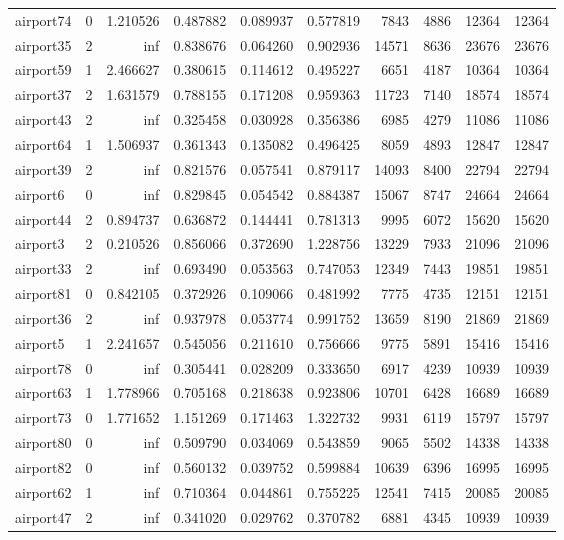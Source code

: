 \begin{longtable}{|l|r|r|r|r|r|r|r|r|r|}
airport74 & 0 & 1.210526 & 0.487882 & 0.089937 & 0.577819 & 7843 & 4886 & 12364 & 12364 \\
airport35 & 2 & inf & 0.838676 & 0.064260 & 0.902936 & 14571 & 8636 & 23676 & 23676 \\
airport59 & 1 & 2.466627 & 0.380615 & 0.114612 & 0.495227 & 6651 & 4187 & 10364 & 10364 \\
airport37 & 2 & 1.631579 & 0.788155 & 0.171208 & 0.959363 & 11723 & 7140 & 18574 & 18574 \\
airport43 & 2 & inf & 0.325458 & 0.030928 & 0.356386 & 6985 & 4279 & 11086 & 11086 \\
airport64 & 1 & 1.506937 & 0.361343 & 0.135082 & 0.496425 & 8059 & 4893 & 12847 & 12847 \\
airport39 & 2 & inf & 0.821576 & 0.057541 & 0.879117 & 14093 & 8400 & 22794 & 22794 \\
airport6 & 0 & inf & 0.829845 & 0.054542 & 0.884387 & 15067 & 8747 & 24664 & 24664 \\
airport44 & 2 & 0.894737 & 0.636872 & 0.144441 & 0.781313 & 9995 & 6072 & 15620 & 15620 \\
airport3 & 2 & 0.210526 & 0.856066 & 0.372690 & 1.228756 & 13229 & 7933 & 21096 & 21096 \\
airport33 & 2 & inf & 0.693490 & 0.053563 & 0.747053 & 12349 & 7443 & 19851 & 19851 \\
airport81 & 0 & 0.842105 & 0.372926 & 0.109066 & 0.481992 & 7775 & 4735 & 12151 & 12151 \\
airport36 & 2 & inf & 0.937978 & 0.053774 & 0.991752 & 13659 & 8190 & 21869 & 21869 \\
airport5 & 1 & 2.241657 & 0.545056 & 0.211610 & 0.756666 & 9775 & 5891 & 15416 & 15416 \\
airport78 & 0 & inf & 0.305441 & 0.028209 & 0.333650 & 6917 & 4239 & 10939 & 10939 \\
airport63 & 1 & 1.778966 & 0.705168 & 0.218638 & 0.923806 & 10701 & 6428 & 16689 & 16689 \\
airport73 & 0 & 1.771652 & 1.151269 & 0.171463 & 1.322732 & 9931 & 6119 & 15797 & 15797 \\
airport80 & 0 & inf & 0.509790 & 0.034069 & 0.543859 & 9065 & 5502 & 14338 & 14338 \\
airport82 & 0 & inf & 0.560132 & 0.039752 & 0.599884 & 10639 & 6396 & 16995 & 16995 \\
airport62 & 1 & inf & 0.710364 & 0.044861 & 0.755225 & 12541 & 7415 & 20085 & 20085 \\
airport47 & 2 & inf & 0.341020 & 0.029762 & 0.370782 & 6881 & 4345 & 10939 & 10939 \\

\end{longtable}
